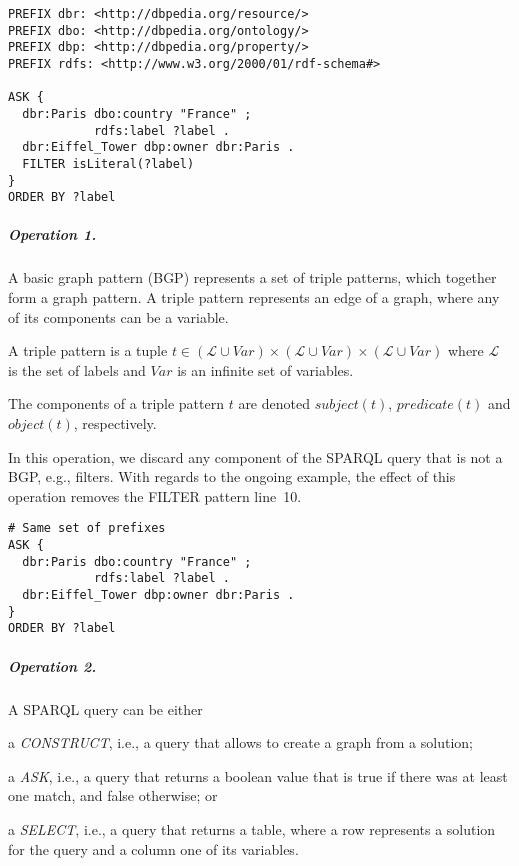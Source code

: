 \begin{verbatim}
PREFIX dbr: <http://dbpedia.org/resource/>
PREFIX dbo: <http://dbpedia.org/ontology/>
PREFIX dbp: <http://dbpedia.org/property/>
PREFIX rdfs: <http://www.w3.org/2000/01/rdf-schema#>

ASK {
  dbr:Paris dbo:country "France" ;
            rdfs:label ?label .
  dbr:Eiffel_Tower dbp:owner dbr:Paris .
  FILTER isLiteral(?label)
}
ORDER BY ?label
\end{verbatim}

\subparagraph{Operation 1.}

A basic graph pattern (BGP) represents a set of triple patterns, which together form a graph pattern. A triple pattern represents an edge of a graph, where any of its components can be a variable.
\begin{definition} A triple pattern is a tuple $t \in (\mathcal{L} \cup Var) \times (\mathcal{L} \cup Var) \times (\mathcal{L} \cup Var)$ where $\mathcal{L}$ is the set of labels and $Var$ is an infinite set of variables.
\label{def:triple-pattern}
\end{definition}
The components of a triple pattern $t$ are denoted $subject(t)$, $predicate(t)$ and $object(t)$, respectively.

In this operation, we discard any component of the SPARQL query that is not a BGP, e.g., filters.
With regards to the ongoing example, the effect of this operation removes the FILTER pattern line~10.
\begin{verbatim}
# Same set of prefixes
ASK {
  dbr:Paris dbo:country "France" ;
            rdfs:label ?label .
  dbr:Eiffel_Tower dbp:owner dbr:Paris .
}
ORDER BY ?label
\end{verbatim}

\subparagraph{Operation 2.}

A SPARQL query can be either
\begin{inparaenum}[(i)]
	\item a \emph{CONSTRUCT}, i.e., a query that allows to create a graph from a solution;
	\item a \emph{ASK}, i.e., a query that returns a boolean value that is true if there was at least one match, and false otherwise; or
	\item a \emph{SELECT}, i.e., a query that returns a table, where a row represents a solution for the query and a column one of its variables.
\end{inparaenum}

